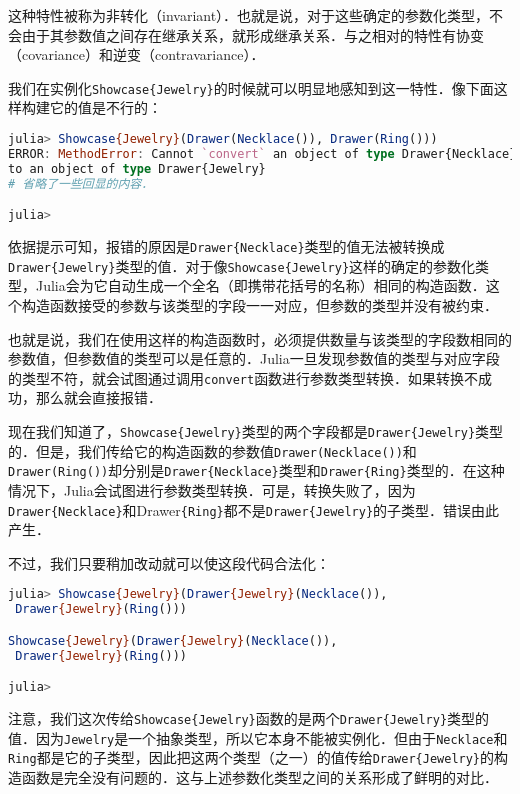 这种特性被称为非转化（invariant）．也就是说，对于这些确定的参数化类型，不会由于其参数值之间存在继承关系，就形成继承关系．与之相对的特性有协变（covariance）和逆变（contravariance）．

我们在实例化\verb|Showcase{Jewelry}|的时候就可以明显地感知到这一特性．像下面这样构建它的值是不行的：
\begin{lstlisting}[language=julia]
julia> Showcase{Jewelry}(Drawer(Necklace()), Drawer(Ring()))
ERROR: MethodError: Cannot `convert` an object of type Drawer{Necklace} 
to an object of type Drawer{Jewelry}
# 省略了一些回显的内容．

julia> 
\end{lstlisting}

依据提示可知，报错的原因是\verb|Drawer{Necklace}|类型的值无法被转换成\verb|Drawer{Jewelry}|类型的值．对于像\verb|Showcase{Jewelry}|这样的确定的参数化类型，Julia会为它自动生成一个全名（即携带花括号的名称）相同的构造函数．这个构造函数接受的参数与该类型的字段一一对应，但参数的类型并没有被约束．

也就是说，我们在使用这样的构造函数时，必须提供数量与该类型的字段数相同的参数值，但参数值的类型可以是任意的．Julia一旦发现参数值的类型与对应字段的类型不符，就会试图通过调用\verb|convert|函数进行参数类型转换．如果转换不成功，那么就会直接报错．

现在我们知道了，\verb|Showcase{Jewelry}|类型的两个字段都是\verb|Drawer{Jewelry}|类型的．但是，我们传给它的构造函数的参数值\verb|Drawer(Necklace())|和\verb|Drawer(Ring())|却分别是\verb|Drawer{Necklace}|类型和\verb|Drawer{Ring}|类型的．在这种情况下，Julia会试图进行参数类型转换．可是，转换失败了，因为\verb|Drawer{Necklace}|和Drawer\verb|{Ring}|都不是\verb|Drawer{Jewelry}|的子类型．错误由此产生．

不过，我们只要稍加改动就可以使这段代码合法化：
\begin{lstlisting}[language=julia]
julia> Showcase{Jewelry}(Drawer{Jewelry}(Necklace()),
 Drawer{Jewelry}(Ring()))

Showcase{Jewelry}(Drawer{Jewelry}(Necklace()),
 Drawer{Jewelry}(Ring()))

julia> 
\end{lstlisting}

注意，我们这次传给\verb|Showcase{Jewelry}|函数的是两个\verb|Drawer{Jewelry}|类型的值．因为\verb|Jewelry|是一个抽象类型，所以它本身不能被实例化．但由于\verb|Necklace|和\verb|Ring|都是它的子类型，因此把这两个类型（之一）的值传给\verb|Drawer{Jewelry}|的构造函数是完全没有问题的．这与上述参数化类型之间的关系形成了鲜明的对比．

